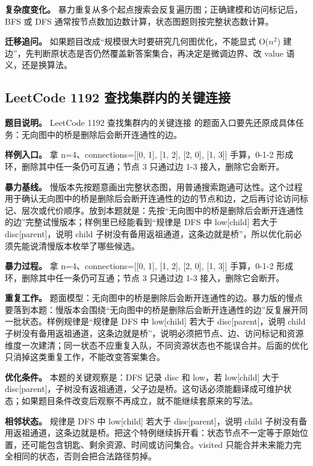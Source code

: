 \textbf{复杂度变化。} 暴力重复从多个起点搜索会反复遍历图；正确建模和访问标记后，BFS 或 DFS 通常按节点数加边数计算，状态图题则按完整状态数计算。

\textbf{迁移追问。} 如果题目改成“规模很大时要研究几何图优化，不能显式 O(\ensuremath{n^{2}}) 建边”，先判断原状态是否仍然覆盖新答案集合，再决定是微调边界、改 value 语义，还是换算法。

\subsection{LeetCode 1192 查找集群内的关键连接}

\textbf{题目说明。} LeetCode 1192 查找集群内的关键连接 的题面入口要先还原成具体任务：无向图中的桥是删除后会断开连通性的边。

\textbf{样例入口。} 拿 n=4、connections=[[0, 1], [1, 2], [2, 0], [1, 3]] 手算，0-1-2 形成环，删除其中任一条仍可互通；节点 3 只通过边 1-3 接入，删除它会断开。

\textbf{暴力基线。} 慢版本先按题意画出完整状态图，用普通搜索跑通可达性。这个过程用于确认无向图中的桥是删除后会断开连通性的边的节点和边，之后再讨论访问标记、层次或代价顺序。放到本题就是：先按“无向图中的桥是删除后会断开连通性的边”完整试慢版本；样例里已经能看到“规律是 DFS 中 low[child] 若大于 disc[parent]，说明 child 子树没有备用返祖通道，这条边就是桥”，所以优化前必须先能说清慢版本枚举了哪些候选。

\textbf{暴力过程。} 拿 n=4、connections=[[0, 1], [1, 2], [2, 0], [1, 3]] 手算，0-1-2 形成环，删除其中任一条仍可互通；节点 3 只通过边 1-3 接入，删除它会断开。

\textbf{重复工作。} 题面模型：无向图中的桥是删除后会断开连通性的边。暴力版的慢点要落到本题：慢版本会围绕“无向图中的桥是删除后会断开连通性的边”反复展开同一批状态。样例规律是“规律是 DFS 中 low[child] 若大于 disc[parent]，说明 child 子树没有备用返祖通道，这条边就是桥”，说明必须把节点、边、访问标记和资源维度一次建清；同一状态不应重复入队，不同资源状态也不能误合并。后面的优化只消掉这类重复工作，不能改变答案集合。

\textbf{优化条件。} 本题的关键观察是：DFS 记录 disc 和 low，若 low[child] 大于 disc[parent]，子树没有返祖通道，父子边是桥。这句话必须能翻译成可维护状态；如果题目条件改变后观察不再成立，就不能继续套原来的写法。

\textbf{相邻状态。} 规律是 DFS 中 low[child] 若大于 disc[parent]，说明 child 子树没有备用返祖通道，这条边就是桥。把这个特例继续拆开看：状态节点不一定等于原始位置，还可能包含钥匙、剩余资源、时间或访问集合。visited 只能合并未来能力完全相同的状态，否则会把合法路径剪掉。

